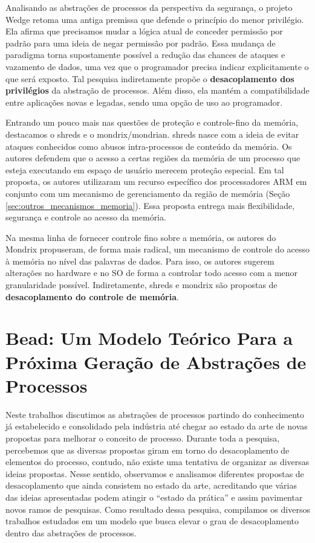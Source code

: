 Analisando as abstrações de processos da perspectiva da segurança, o projeto
Wedge retoma uma antiga premissa que defende o princípio do menor privilégio.
Ela afirma que precisamos mudar a lógica atual de conceder permissão por
padrão para uma ideia de negar permissão por padrão. Essa mudança de paradigma
torna supostamente possível a redução das chances de ataques e vazamento de
dados, uma vez que o programador precisa indicar explicitamente o que será
exposto. Tal pesquisa indiretamente propõe o \textbf{desacoplamento dos
privilégios} da abstração de processos. Além disso, ela mantém a
compatibilidade entre aplicações novas e legadas, sendo uma opção de uso ao programador.

Entrando um pouco mais nas questões de proteção e controle-fino da memória,
destacamos o shreds e o mondrix/mondrian. shreds nasce com a ideia de evitar
ataques conhecidos como abusos intra-processos de conteúdo da memória. Os
autores defendem que o acesso a certas regiões da memória de um processo
que esteja executando em espaço de usuário merecem proteção especial. Em tal proposta, os
autores utilizaram um recurso específico dos processadores ARM em conjunto com
um mecanismo de gerenciamento da região de memória (Seção
\ref{sec:outros_mecanismos_memoria}). Essa proposta entrega mais flexibilidade,
segurança e controle ao acesso da memória.

Na mesma linha de fornecer controle fino sobre a memória, os autores do Mondrix
propuseram, de forma mais radical, um mecanismo de controle do acesso à memória
no nível das palavras de dados. Para isso, os autores sugerem alterações no
hardware e no SO de forma a controlar todo acesso com a menor granularidade
possível. Indiretamente, shreds e mondrix são propostas de
\textbf{desacoplamento do controle de memória}.

\section{Bead: Um Modelo Teórico Para a Próxima Geração de Abstrações de Processos}
\label{sec:bead}

Neste trabalhos discutimos as abstrações de processos partindo do conhecimento
já estabelecido e consolidado pela indústria até chegar ao estado da arte de
novas propostas para melhorar o conceito de processo. Durante toda a pesquisa,
percebemos que as diversas propostas giram em torno do desacoplamento de
elementos do processo, contudo, não existe uma tentativa de organizar as
diversas ideias propostas. Nesse sentido, observamos e analisamos diferentes propostas de
desacoplamento que ainda consistem no estado da arte, acreditando que várias
das ideias apresentadas podem atingir o ``estado da prática'' e assim pavimentar
novos ramos de pesquisas. Como resultado dessa pesquisa, compilamos os diversos
trabalhos estudados em um modelo que busca elevar o grau de desacoplamento
dentro das abstrações de processos.

